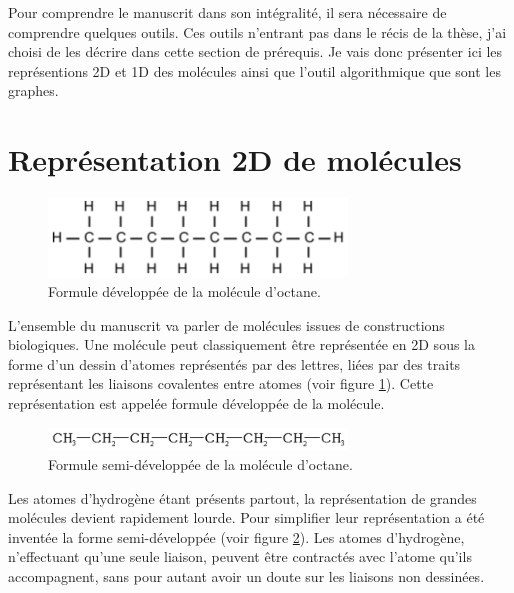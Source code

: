 Pour comprendre le manuscrit dans son intégralité, il sera nécessaire de comprendre quelques outils.
Ces outils n'entrant pas dans le récis de la thèse, j'ai choisi de les décrire dans cette section de prérequis.
Je vais donc présenter ici les représentions 2D et 1D des molécules ainsi que l'outil algorithmique que sont les graphes.

\section{Représentation 2D de molécules}

\begin{figure}[h!]
  \begin{center}
    \includegraphics[width=300px]{Figures/Prerequis/developpee.png}
    \caption{\label{dev}Formule développée de la molécule d'octane.}
  \end{center}
\end{figure}

L'ensemble du manuscrit va parler de molécules issues de constructions biologiques.
Une molécule peut classiquement être représentée en 2D sous la forme d'un dessin d'atomes représentés par des lettres, liées par des traits représentant les liaisons covalentes entre atomes (voir figure \ref{dev}).
Cette représentation est appelée formule développée de la molécule.

\begin{figure}[h!]
  \begin{center}
    \includegraphics[width=300px]{Figures/Prerequis/semi.png}
    \caption{\label{semi}Formule semi-développée de la molécule d'octane.}
  \end{center}
\end{figure}

Les atomes d'hydrogène étant présents partout, la représentation de grandes molécules devient rapidement lourde.
Pour simplifier leur représentation a été inventée la forme semi-développée (voir figure \ref{semi}).
Les atomes d'hydrogène, n'effectuant qu'une seule liaison, peuvent être contractés avec l'atome qu'ils accompagnent, sans pour autant avoir un doute sur les liaisons non dessinées.


